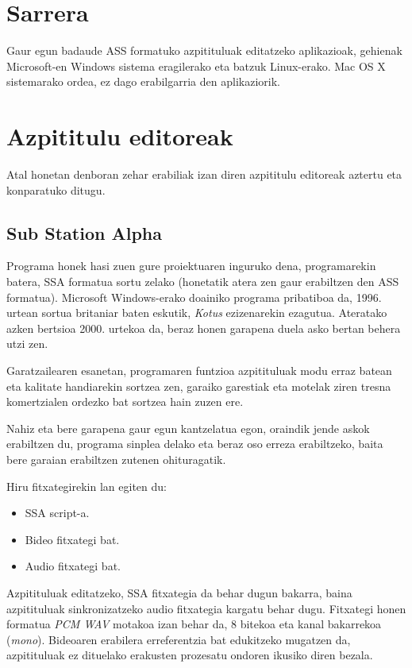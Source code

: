
\section{Sarrera}
Gaur egun badaude ASS formatuko azpitituluak editatzeko aplikazioak, gehienak Microsoft-en Windows sistema eragilerako eta batzuk Linux-erako. Mac OS X sistemarako ordea, ez dago erabilgarria den aplikaziorik.
\section{Azpititulu editoreak}
Atal honetan denboran zehar erabiliak izan diren azpititulu editoreak aztertu eta konparatuko ditugu.
\subsection{Sub Station Alpha}
Programa honek hasi zuen gure proiektuaren inguruko dena, programarekin batera, SSA formatua sortu zelako (honetatik atera zen gaur erabiltzen den ASS formatua). Microsoft Windows-erako doainiko programa pribatiboa da, 1996. urtean sortua britaniar baten eskutik, \textit{Kotus} ezizenarekin ezagutua. Ateratako azken bertsioa 2000. urtekoa da, beraz honen garapena duela asko bertan behera utzi zen.

Garatzailearen esanetan, programaren funtzioa azpitituluak modu erraz batean eta kalitate handiarekin sortzea zen, garaiko garestiak eta motelak ziren tresna komertzialen ordezko bat sortzea hain zuzen ere.

Nahiz eta bere garapena gaur egun kantzelatua egon, oraindik jende askok erabiltzen du, programa sinplea delako eta beraz oso erreza erabiltzeko, baita bere garaian erabiltzen zutenen ohituragatik.

Hiru fitxategirekin lan egiten du:
\begin{itemize}
\item SSA script-a.
\item Bideo fitxategi bat.
\item Audio fitxategi bat.
\end{itemize}

Azpitituluak editatzeko, SSA fitxategia da behar dugun bakarra, baina azpitituluak sinkronizatzeko audio fitxategia kargatu behar dugu. Fitxategi honen formatua \textit{PCM WAV} motakoa izan behar da, 8 bitekoa eta kanal bakarrekoa (\textit{mono}). Bideoaren erabilera erreferentzia bat edukitzeko mugatzen da, azpitituluak ez dituelako erakusten prozesatu ondoren ikusiko diren bezala.

